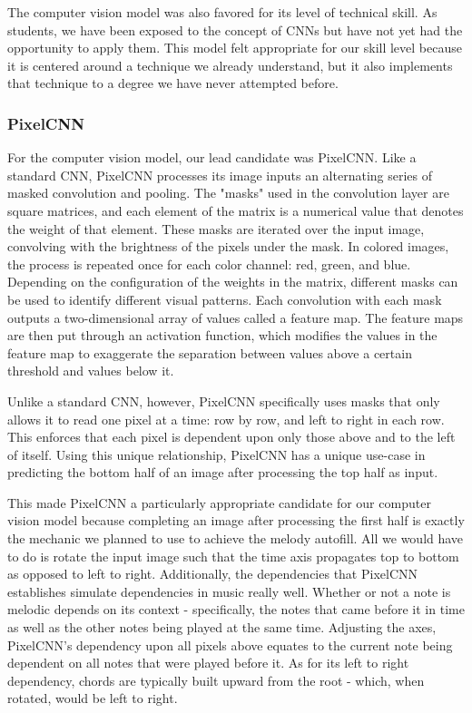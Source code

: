 The computer vision model was also favored for its level of technical skill. As students, we
have been exposed to the concept of CNNs but have not yet had the opportunity to apply
them. This model felt appropriate for our skill level because it is centered around a
technique we already understand, but it also implements that technique to a degree we have
never attempted before.

\subsubsection{PixelCNN}

For the computer vision model, our lead candidate was PixelCNN. Like a standard CNN,
PixelCNN processes its image inputs an alternating series of masked convolution and pooling.
The "masks" used in the convolution layer are square matrices, and each element of the matrix
is a numerical value that denotes the weight of that element. These masks are iterated over the
input image, convolving with the brightness of the pixels under the mask. In colored images,
the process is repeated once for each color channel: red, green, and blue. Depending on the
configuration of the weights in the matrix, different masks can be used to identify different
visual patterns. Each convolution with each mask outputs a two-dimensional array of values
called a feature map. The feature maps are then put through an activation function, which
modifies the values in the feature map to exaggerate the separation between values above a
certain threshold and  values below it.

Unlike a standard CNN, however, PixelCNN specifically uses masks that only allows it to read
one pixel at a time: row by row, and left to right in each row. This enforces that each pixel
is dependent upon only those above and to the left of itself. Using this unique relationship,
PixelCNN has a unique use-case in predicting the bottom half of an image after processing the
top half as input.

This made PixelCNN a particularly appropriate candidate for our computer vision model because
completing an image after processing the first half is exactly the mechanic we planned to use
to achieve the melody autofill. All we would have to do is rotate the input image such that
the time axis propagates top to bottom as opposed to left to right. Additionally, the
dependencies that PixelCNN establishes simulate dependencies in music really well. Whether or
not a note is melodic depends on its context - specifically, the notes that came before it in
time as well as the other notes being played at the same time. Adjusting the axes, PixelCNN's
dependency upon all pixels above equates to the current note being dependent on all notes
that were played before it. As for its left to right dependency, chords are typically built
upward from the root - which, when rotated, would be left to right.

